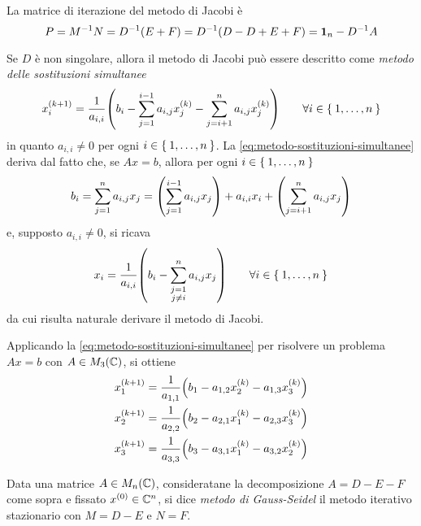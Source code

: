 	La matrice di iterazione del metodo di Jacobi è
	\begin{equation*}
		P = M^{-1} N = D^{-1} (E + F) = D^{-1} (D - D + E + F) = \mathbf{1}_n - D^{-1} A
	\end{equation*}

	\begin{osservazione}
		Se \(D\) è non singolare, allora il metodo di Jacobi può essere descritto come \emph{metodo delle sostituzioni simultanee}
		\begin{equation}\label{eq:metodo-sostituzioni-simultanee}
			x_i^{(k + 1)} = \frac{1}{a_{i, i}} \qty(b_i - \sum_{j = 1}^{i - 1} a_{i, j} x_j^{(k)} - \sum_{j = i + 1}^n a_{i, j} x_j^{(k)}) \qquad \forall i \in \Set{1, \dots, n}
		\end{equation}
		in quanto \(a_{i, i} \ne 0\) per ogni \(i \in \Set{1, \dots, n}\). La \eqref{eq:metodo-sostituzioni-simultanee} deriva dal fatto che, se \(A x = b\), allora per ogni \(i \in \Set{1, \dots, n}\)
		\begin{equation*}
			b_i = \sum_{j = 1}^n a_{i, j} x_j = \qty(\sum_{j = 1}^{i - 1} a_{i, j} x_j) + a_{i, i} x_i + \qty(\sum_{j = i + 1}^n a_{i, j} x_j)
		\end{equation*}
		e, supposto \(a_{i, i} \ne 0\), si ricava
		\begin{equation*}
			x_i = \frac{1}{a_{i, i}} \qty(b_i - \sum_{\substack{j = 1 \\ j \ne i}}^n a_{i, j} x_j) \qquad \forall i \in \Set{1, \dots, n}
		\end{equation*}
		da cui risulta naturale derivare il metodo di Jacobi.
	\end{osservazione}

	\begin{esempio}
		Applicando la \eqref{eq:metodo-sostituzioni-simultanee} per risolvere un problema \(A x = b\) con \(A \in M_3 (\mathbb{C})\), si ottiene
		\begin{align*}
			x_1^{(k + 1)} &= \frac{1}{a_{1, 1}} \qty(b_1 - a_{1, 2} x_2^{(k)} - a_{1, 3} x_3^{(k)}) \\
			x_2^{(k + 1)} &= \frac{1}{a_{2, 2}} \qty(b_2 - a_{2, 1} x_1^{(k)} - a_{2, 3} x_3^{(k)}) \\
			x_3^{(k + 1)} &= \frac{1}{a_{3, 3}} \qty(b_3 - a_{3, 1} x_1^{(k)} - a_{3, 2} x_2^{(k)})
		\end{align*}
	\end{esempio}

	\begin{definizione}\label{def:metodo-gauss-seidel}
		Data una matrice \(A \in M_n (\mathbb{C})\), consideratane la decomposizione \(A = D - E - F\) come sopra e fissato \(x^{(0)} \in \mathbb{C}^n\), si dice \emph{metodo di Gauss-Seidel} il metodo iterativo stazionario con \(M = D - E\) e \(N = F\).
	\end{definizione}

